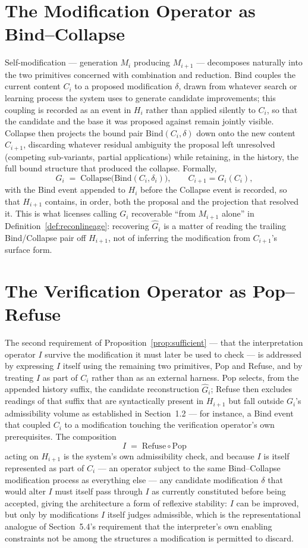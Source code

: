 \documentclass[11pt]{book}
\begin{document}
\section{The Modification Operator as Bind--Collapse}

Self-modification --- generation $M_i$ producing $M_{i+1}$ --- decomposes naturally into the two primitives concerned with combination and reduction. Bind couples the current content $C_i$ to a proposed modification $\delta$, drawn from whatever search or learning process the system uses to generate candidate improvements; this coupling is recorded as an event in $H_i$ rather than applied silently to $C_i$, so that the candidate and the base it was proposed against remain jointly visible. Collapse then projects the bound pair $\mathrm{Bind}(C_i, \delta)$ down onto the new content $C_{i+1}$, discarding whatever residual ambiguity the proposal left unresolved (competing sub-variants, partial applications) while retaining, in the history, the full bound structure that produced the collapse. Formally,
\[
G_i \;=\; \mathrm{Collapse}\big(\mathrm{Bind}(C_i, \delta_i)\big), \qquad C_{i+1} = G_i(C_i),
\]
with the Bind event appended to $H_i$ before the Collapse event is recorded, so that $H_{i+1}$ contains, in order, both the proposal and the projection that resolved it. This is what licenses calling $G_i$ recoverable ``from $M_{i+1}$ alone'' in Definition~\ref{def:reconlineage}: recovering $\widehat{G}_i$ is a matter of reading the trailing Bind/Collapse pair off $H_{i+1}$, not of inferring the modification from $C_{i+1}$'s surface form.

\section{The Verification Operator as Pop--Refuse}

The second requirement of Proposition~\ref{prop:sufficient} --- that the interpretation operator $I$ survive the modification it must later be used to check --- is addressed by expressing $I$ itself using the remaining two primitives, Pop and Refuse, and by treating $I$ as part of $C_i$ rather than as an external harness. Pop selects, from the appended history suffix, the candidate reconstruction $\widehat{G}_i$; Refuse then excludes readings of that suffix that are syntactically present in $H_{i+1}$ but fall outside $G_i$'s admissibility volume as established in Section~1.2 --- for instance, a Bind event that coupled $C_i$ to a modification touching the verification operator's own prerequisites. The composition
\[
I \;=\; \mathrm{Refuse} \circ \mathrm{Pop}
\]
acting on $H_{i+1}$ is the system's own admissibility check, and because $I$ is itself represented as part of $C_i$ --- an operator subject to the same Bind--Collapse modification process as everything else --- any candidate modification $\delta$ that would alter $I$ must itself pass through $I$ as currently constituted before being accepted, giving the architecture a form of reflexive stability: $I$ can be improved, but only by modifications $I$ itself judges admissible, which is the representational analogue of Section~5.4's requirement that the interpreter's own enabling constraints not be among the structures a modification is permitted to discard.
\end{document}
